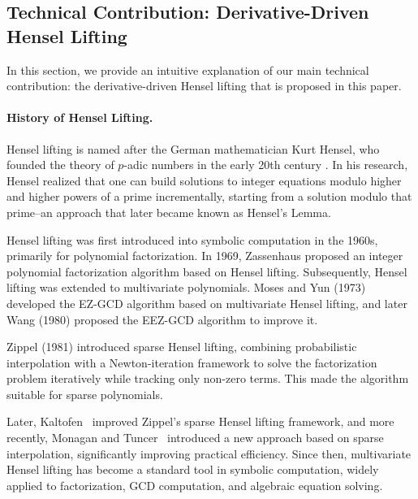 \documentclass{article}
\numberwithin{equation}{section}
\begin{document}
\subsection{Technical Contribution: Derivative-Driven Hensel Lifting}
In this section, we provide an intuitive explanation of our main technical contribution: the derivative-driven Hensel lifting that is proposed in this paper.

\paragraph{History of Hensel Lifting.}
Hensel lifting is named after the German mathematician Kurt Hensel, who founded the theory of $p$-adic numbers in the early 20th century \cite{hensel1908}. In his research, Hensel realized that one can build solutions to integer equations modulo higher and higher powers of a prime incrementally, starting from a solution modulo that prime--an approach that later became known as Hensel’s Lemma.
%

Hensel lifting was first introduced into symbolic computation in the 1960s, primarily for polynomial factorization. In 1969, Zassenhaus \cite{zassenhaus1969} proposed an integer polynomial factorization algorithm based on Hensel lifting.
%
Subsequently, Hensel lifting was extended to multivariate polynomials. Moses and Yun (1973) \cite{moses1973} developed the EZ-GCD algorithm based on multivariate Hensel lifting, and later Wang (1980) \cite{wang1980} proposed the EEZ-GCD algorithm to improve it.



Zippel (1981) \cite{zippel1981} introduced sparse Hensel lifting, combining probabilistic interpolation with a Newton-iteration framework to solve the factorization problem iteratively while tracking only non-zero terms. This made the algorithm suitable for sparse polynomials. 



Later, Kaltofen~\cite{kaltofen1985b} improved Zippel's sparse Hensel lifting framework, and more recently, Monagan and Tuncer~\cite{MonaganTuncer2016,MonaganTuncer2020} introduced a new approach based on sparse interpolation, significantly improving practical efficiency.
%
Since then, multivariate Hensel lifting has become a standard tool in symbolic computation, widely applied to factorization, GCD computation, and algebraic equation solving.


\end{document}
